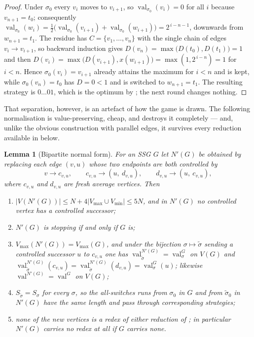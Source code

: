 \documentclass[11pt]{article}
\theoremstyle{plain}
\newtheorem{lemma}[theorem]{Lemma}
\theoremstyle{definition}
\DeclareMathOperator{\val}{val}
\newcommand{\Vmax}{V_{\max}}
\newcommand{\Vmin}{V_{\min}}
\begin{document}
\begin{proof}
Under $\sigma_0$ every $v_i$ moves to $v_{i+1}$, so
$\val_{\sigma_0}(v_i)=0$ for all $i$ because $v_{n+1}=t_0$; consequently
$\val_{\sigma_0}(w_i)=\tfrac12\bigl(\val_{\sigma_0}(v_{i+1})+\val_{\sigma_0}(w_{i+1})\bigr)
=2^{\,i-n-1}$, downwards from $w_{n+1}=t_1$. The residue has
$C=\{v_1,\dots,v_n\}$ with the single chain of edges
$v_i\to v_{i+1}$, so backward induction gives
$D(v_n)=\max\bigl(D(t_0),D(t_1)\bigr)=1$ and then
$D(v_i)=\max\bigl(D(v_{i+1}),x(w_{i+1})\bigr)=\max(1,2^{\,i-n})=1$ for
$i<n$. Hence $\sigma_0(v_i)=v_{i+1}$ already attains the maximum for
$i<n$ and is kept, while $\sigma_0(v_n)=t_0$ has $D=0<1$ and is switched
to $w_{n+1}=t_1$. The resulting strategy is $0\dots01$, which is the
optimum by ; the next round changes nothing.
\end{proof}

That separation, however, is an artefact of how the game is drawn. The
following normalisation is value-preserving, cheap, and destroys it
completely --- and, unlike the obvious construction with parallel edges,
it survives every reduction available in  below.

\begin{lemma}[Bipartite normal form]\label{lem:normalform}
For an SSG $G$ let $N'(G)$ be obtained by replacing each edge $(v,u)$
whose two endpoints are both controlled by
\[
  v\to c_{v,u},\qquad c_{v,u}\to(u,\ d_{v,u}),\qquad d_{v,u}\to(u,\ c_{v,u}),
\]
where $c_{v,u}$ and $d_{v,u}$ are fresh average vertices. Then
\begin{enumerate}[label=(\roman*),leftmargin=2.2em]
\item $|V(N'(G))|\le N+4|\Vmax\cup\Vmin|\le5N$, and in $N'(G)$ no
      controlled vertex has a controlled successor;
\item $N'(G)$ is stopping if and only if $G$ is;
\item $\Vmax(N'(G))=\Vmax(G)$, and under the bijection
      $\sigma\mapsto\tilde\sigma$ sending a controlled successor $u$ to
      $c_{v,u}$ one has $\val^{N'(G)}_{\tilde\sigma}=\val^{G}_\sigma$ on
      $V(G)$ and
      $\val^{N'(G)}_{\tilde\sigma}(c_{v,u})=\val^{N'(G)}_{\tilde\sigma}(d_{v,u})
      =\val^{G}_\sigma(u)$; likewise $\val^{N'(G)}=\val^{G}$ on $V(G)$;
\item $S_{\tilde\sigma}=S_\sigma$ for every $\sigma$, so the all-switches
      runs from $\sigma_0$ in $G$ and from $\tilde\sigma_0$ in $N'(G)$
      have the same length and pass through corresponding strategies;
\item none of the new vertices is a redex of either reduction of
      ; in particular $N'(G)$ carries no redex at all if
      $G$ carries none.
\end{enumerate}
\end{lemma}
\end{document}
